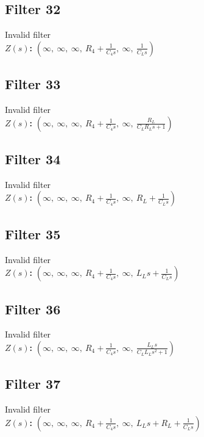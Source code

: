 \documentclass{article}
\begin{document}
\subsection*{Filter 32}
Invalid filter \\ 
\textbf{$Z(s)$:} $\left( \infty, \  \infty, \  \infty, \  R_{4} + \frac{1}{C_{4} s}, \  \infty, \  \frac{1}{C_{L} s}\right)$ \\ 
\subsection*{Filter 33}
Invalid filter \\ 
\textbf{$Z(s)$:} $\left( \infty, \  \infty, \  \infty, \  R_{4} + \frac{1}{C_{4} s}, \  \infty, \  \frac{R_{L}}{C_{L} R_{L} s + 1}\right)$ \\ 
\subsection*{Filter 34}
Invalid filter \\ 
\textbf{$Z(s)$:} $\left( \infty, \  \infty, \  \infty, \  R_{4} + \frac{1}{C_{4} s}, \  \infty, \  R_{L} + \frac{1}{C_{L} s}\right)$ \\ 
\subsection*{Filter 35}
Invalid filter \\ 
\textbf{$Z(s)$:} $\left( \infty, \  \infty, \  \infty, \  R_{4} + \frac{1}{C_{4} s}, \  \infty, \  L_{L} s + \frac{1}{C_{L} s}\right)$ \\ 
\subsection*{Filter 36}
Invalid filter \\ 
\textbf{$Z(s)$:} $\left( \infty, \  \infty, \  \infty, \  R_{4} + \frac{1}{C_{4} s}, \  \infty, \  \frac{L_{L} s}{C_{L} L_{L} s^{2} + 1}\right)$ \\ 
\subsection*{Filter 37}
Invalid filter \\ 
\textbf{$Z(s)$:} $\left( \infty, \  \infty, \  \infty, \  R_{4} + \frac{1}{C_{4} s}, \  \infty, \  L_{L} s + R_{L} + \frac{1}{C_{L} s}\right)$ \\ 
\end{document}

